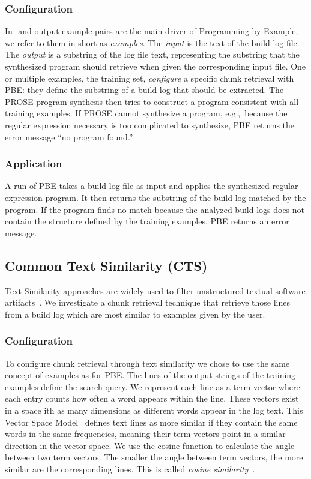 \subsubsection{Configuration}
In- and output example pairs are the main driver of Programming by
Example; we refer to them in short as \emph{examples}.
The \emph{input} is the text of the build log file.
The \emph{output} is
a substring of the log file text, representing the
substring that the synthesized program should retrieve when
given the corresponding input file.
One or multiple examples, the
training set, \emph{configure} a specific chunk retrieval with PBE:
they define the substring of a build log that should be extracted.
The PROSE program synthesis then tries to construct a program
consistent with all training examples.
If PROSE cannot synthesize a program, e.g.,\
because the regular expression
necessary is too complicated to synthesize, PBE returns the
error message ``no program found.''

\subsubsection{Application}
A run of PBE takes a build log file as input and applies the
synthesized regular expression program.
It then returns the substring
of the build log matched by the program.
If the program finds no match because the analyzed build logs
does not contain the structure defined by the training examples,
PBE returns an error message.

\subsection{Common Text Similarity (CTS)}
Text Similarity approaches are widely used to filter unstructured
textual software artifacts~\cite{runeson2007detection,
marcus2005recovery,antoniol2002recovering,mccarey2006recommending}.
We investigate a chunk retrieval technique that
retrieve those lines from a build log which are most
similar to examples given by the user.

\subsubsection{Configuration}
To configure chunk retrieval through text similarity we chose to use
the same concept of examples as for PBE.
The lines of the output strings of the training examples define the
search query.
We represent each line as a term vector where each entry counts
how often a word appears within the line.
These vectors exist in a space ith as many dimensions as different
words appear in the log text.
This Vector Space Model~\cite{schutze2008introduction} defines
text lines as more similar if they contain the same words in the same
frequencies, meaning their term vectors point in a similar direction
in the vector space.
We use the cosine function to calculate the angle between two
term vectors.
The smaller the angle between term vectors, the more similar are the
corresponding lines.
This is called \emph{cosine similarity}~\cite{korenius2007principal}.

